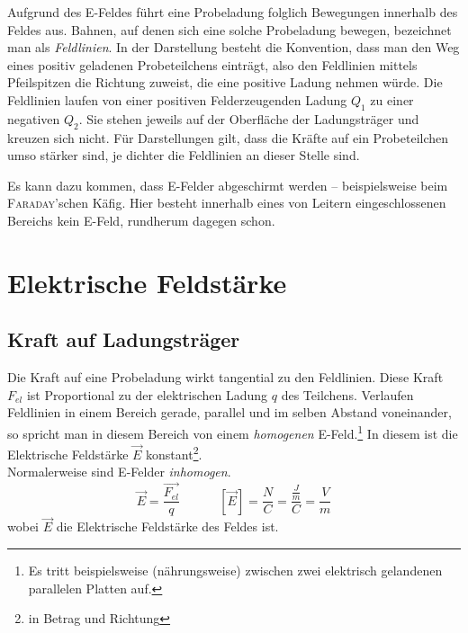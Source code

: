Aufgrund des E-Feldes führt eine Probeladung folglich Bewegungen innerhalb des Feldes aus. Bahnen, auf denen sich eine solche Probeladung bewegen, bezeichnet man als \textit{Feldlinien}. In der Darstellung besteht die Konvention, dass man den Weg eines positiv geladenen Probeteilchens einträgt, also den Feldlinien mittels Pfeilspitzen die Richtung zuweist, die eine positive Ladung nehmen würde. Die Feldlinien laufen von einer positiven Felderzeugenden Ladung \(Q_1\) zu einer negativen \(Q_2\). Sie stehen jeweils auf der Oberfläche der Ladungsträger und kreuzen sich nicht. Für Darstellungen gilt, dass die Kräfte auf ein Probeteilchen umso stärker sind, je dichter die Feldlinien an dieser Stelle sind.

Es kann dazu kommen, dass E-Felder abgeschirmt werden -- beispielsweise beim \textsc{Faraday}'schen Käfig. Hier besteht innerhalb eines von Leitern eingeschlossenen Bereichs kein E-Feld, rundherum dagegen schon.

		\chapter{Elektrische Feldstärke}
		
		\section{Kraft auf Ladungsträger}
		\label{F_auf_q}
Die Kraft auf eine Probeladung wirkt tangential zu den Feldlinien. Diese Kraft \(F_{el}\) ist Proportional zu der elektrischen Ladung \(q\) des Teilchens. Verlaufen Feldlinien in einem Bereich gerade, parallel und im selben Abstand voneinander, so spricht man in diesem Bereich von einem \textit{homogenen} E-Feld.\footnote{Es tritt beispielsweise (nährungsweise) zwischen zwei elektrisch gelandenen parallelen Platten auf.} In diesem ist die Elektrische Feldstärke \(\vec{E}\) konstant\footnote{in Betrag und Richtung}. \\
Normalerweise sind E-Felder \textit{inhomogen}.
	\begin{equation}
	\vec{E} = \frac{\vec{F_{el}}}{q} ~~~~~~~~~~~~~~ [\vec{E}] = \frac{N}{C} = \frac{\frac{J}{m}}{C} = \frac{V}{m}
	\label{def_E}
	\end{equation}
wobei \(\vec{E}\) die Elektrische Feldstärke des Feldes ist.


